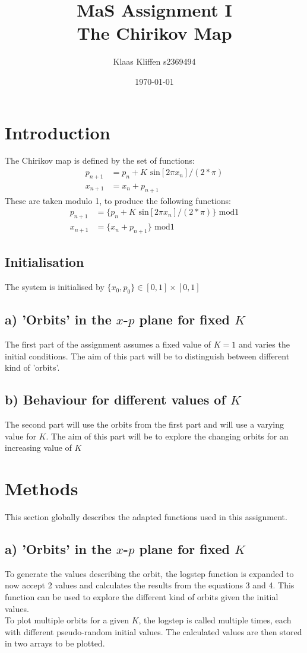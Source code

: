 \documentclass[a4paper,11pt]{article}
\title{MaS Assignment I\\
\large The Chirikov Map}
\author{Klaas Kliffen s2369494}
\date{\today}
\begin{document}
\maketitle

\section{Introduction}

The Chirikov map is defined by the set of functions:
\begin{align} 
p_{n+1} &= p_n + K \text{ sin}[2\pi x_n] / (2*\pi)\\
x_{n+1} &= x_n + p_{n+1}
\end{align}
These are taken modulo 1, to produce the following functions:
\begin{align} 
p_{n+1} &= \{p_n + K \text{ sin}[2\pi x_n] / (2*\pi)\} \text{ mod} 1\\ 
x_{n+1} &= \{x_n + p_{n+1}\} \text{ mod} 1
\end{align}

\subsection*{Initialisation}
The system is initialised by $\{x_0,p_0\} \in [0,1] \times [0,1]$

\subsection*{a) 'Orbits' in the $x$-$p$ plane for fixed $K$}
The first part of the assignment assumes a fixed value of $K = 1$ and varies the initial conditions. The aim of this part will be to distinguish between different kind of 'orbits'.

\subsection*{b) Behaviour for different values of $K$}
The second part will use the orbits from the first part and will use a varying value for $K$.
The aim of this part will be to explore the changing orbits for an increasing value of $K$

\section{Methods}
This section globally describes the adapted functions used in this assignment.

\subsection*{a) 'Orbits' in the $x$-$p$ plane for fixed $K$}
To generate the values describing the orbit, the logstep function is expanded to now accept 2 values and calculates the results from the equations 3 and 4.
This function can be used to explore the different kind of orbits given the initial values.\\
To plot multiple orbits for a given $K$, the logstep is called multiple times, each with different pseudo-random initial values. The calculated values are then stored in two arrays to be plotted.
\end{document}

